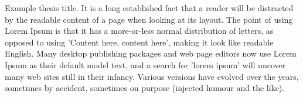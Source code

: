 \begin{cventries}
  \cventry
    {}
    {Example thesis title.}
    {}
    {}
    {
        It is a long established fact that a reader will be distracted by the readable content of a page when looking at
        its layout. The point of using Lorem Ipsum is that it has a more-or-less normal distribution of letters, as
        opposed to using 'Content here, content here', making it look like readable English. Many desktop publishing
        packages and web page editors now use Lorem Ipsum as their default model text, and a search for 'lorem ipsum'
        will uncover many web sites still in their infancy. Various versions have evolved over the years, sometimes by
        accident, sometimes on purpose (injected humour and the like).
    }
  {}
\end{cventries}


